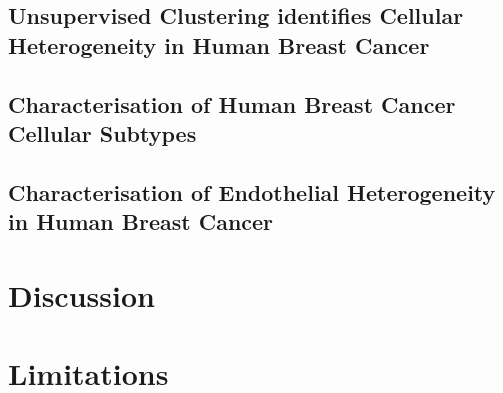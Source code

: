 \subsection{Unsupervised Clustering identifies Cellular Heterogeneity in Human Breast Cancer}
\label{sub:scs_cluster_heterogeneity}

\subsection{Characterisation of Human Breast Cancer Cellular Subtypes}

\subsection{Characterisation of Endothelial Heterogeneity in Human Breast Cancer}



\section{Discussion}

\section{Limitations}
